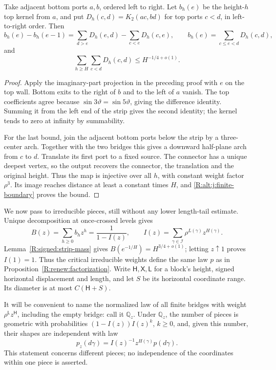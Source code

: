 \begin{lemma}\label{R:signed:bridge-pair}
Take adjacent bottom ports $a,b$, ordered left to right. Let $b_h(e)$ be
the height-$h$ top kernel from $a$, and put
$D_h(c,d)=K_2(ac,bd)$ for top ports $c<d$, in left-to-right order. Then
\[
 b_h(e)-b_h(e-1)=\sum_{d>e}D_h(e,d)-\sum_{c<e}D_h(c,e),
 \qquad b_h(e)=\sum_{c\le e<d}D_h(c,d),
\]
and
\begin{equation}\label{R:alt:j:eq-br6}
 \sum_{h\ge H}\sum_{c<d}D_h(c,d)\le H^{-1/4+o(1)}.
\end{equation}
\end{lemma}
\begin{proof}
Apply the imaginary-part projection in the preceding proof with $e$ on
the top wall. Bottom exits to the right of $b$ and to the left of $a$
vanish. The top coefficients agree because
$\sin3\vartheta=\sin5\vartheta$, giving the difference identity.
Summing it from the left end of the strip gives the second identity;
the kernel tends to zero at infinity by summability.

For the last bound, join the adjacent bottom ports below the strip by a
three-center arch. Together with the two bridges this gives a downward
half-plane arch from $c$ to $d$. Translate its first port to a fixed
source. The connector has a unique deepest vertex, so the output recovers
the connector, the translation and the original height. Thus the map is
injective over all $h$, with constant weight factor $\rho^3$. Its image
reaches distance at least a constant times $H$, and
\eqref{R:alt:j:finite-boundary} proves the bound.
\end{proof}

We now pass to irreducible pieces, still without any lower length-tail
estimate. Unique decomposition at once-crossed levels gives
\[
 B(z)=\sum_{h\ge0}b_hz^h=\frac1{1-I(z)},\qquad
 I(z)=\sum_{\gamma\in\mathcal I}\rho^{L(\gamma)}z^{H(\gamma)}.
\]
Lemma~\ref{R:signed:strip-mass} gives
$B(e^{-1/H})=H^{3/4+o(1)}$; letting $z\uparrow1$ proves $I(1)=1$.
Thus the critical irreducible weights define the same law $p$ as in
Proposition~\ref{R:renew:factorization}. Write
$\mathsf H,\mathsf X,\mathsf L$ for a block's height, signed horizontal
displacement and length, and let $S$ be its horizontal coordinate range.
Its diameter is at most $C(\mathsf H+S)$.

It will be convenient to name the normalized law of all finite bridges
with weight $\rho^{\mathsf L}z^{\mathsf H}$, including the empty bridge:
call it $\mathbb Q_z$. Under $\mathbb Q_z$, the number of pieces is
geometric with probabilities $(1-I(z))I(z)^k$, $k\ge0$, and, given this
number, their shapes are independent with law
\[
 p_z(d\gamma)=I(z)^{-1}z^{H(\gamma)}p(d\gamma).
\]
This statement concerns different pieces; no independence of the
coordinates within one piece is asserted.

